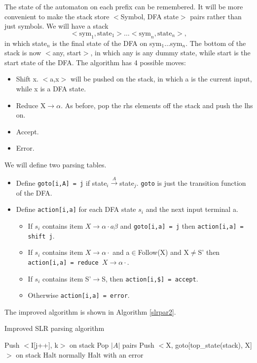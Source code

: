 The state of the automaton on each prefix can be remembered. It will be more convenient to make the stack store $<$Symbol, DFA state$>$ pairs rather than just symbols. We will have a stack 
$$<\text{sym}_1,\text{state}_1>\dots<\text{sym}_n,\text{state}_n>,$$
in which state$_n$ is the final state of the DFA on sym$_1\dots$sym$_n$. The bottom of the stack is now $<$any, start$>$, in which any is any dummy state, while start is the start state of the DFA. The algorithm has 4 possible moves:
\begin{itemize}
\item Shift x. $<$a,x$>$ will be pushed on the stack, in which a is the current input, while x is a DFA state.
\item Reduce X$\rightarrow\alpha$. As before, pop the rhs elements off the stack and push the lhs on.
\item Accept.
\item Error.
\end{itemize}
We will define two parsing tables.
\begin{itemize}
\item Define \texttt{goto[i,A] = j} if state$_i\xrightarrow{A}$state$_j$. \texttt{goto} is just the transition function of the DFA.
\item Define \texttt{action[i,a]} for each DFA state $s_i$ and the next input terminal a.
\begin{itemize}
\item If $s_i$ contains item $X\rightarrow\alpha\cdot a\beta$ and \texttt{goto[i,a] = j} then \texttt{action[i,a] = shift j}.
\item If $s_i$ contains item $X\rightarrow\alpha\cdot$ and a$\in$Follow(X) and X$\neq$S' then \texttt{action[i,a] = reduce $X\rightarrow\alpha\cdot$}.
\item If $s_i$ contains item S'$\rightarrow$S, then \texttt{action[i,\$] = accept}.
\item Otherwise \texttt{action[i,a] = error}.
\end{itemize}\end{itemize}
The improved algorithm is shown in Algorithm \eqref{slrpar2}.
\begin{algorithm}[ht]
\caption{Improved SLR parsing algorithm}\label{slrpar2}
\begin{algorithmic}
\Repeat
		\State Push $<$I[j++], k$>$ on stack
	\endcase
		\State Pop $|A|$ pairs
		\State Push $<$X, goto[top\_state(stack), X]$>$ on stack
	\endcase
		\State Halt normally
	\endcase
		\State Halt with an error
	\endcase
	\endswitch
{}
\end{algorithmic}
\end{algorithm}

